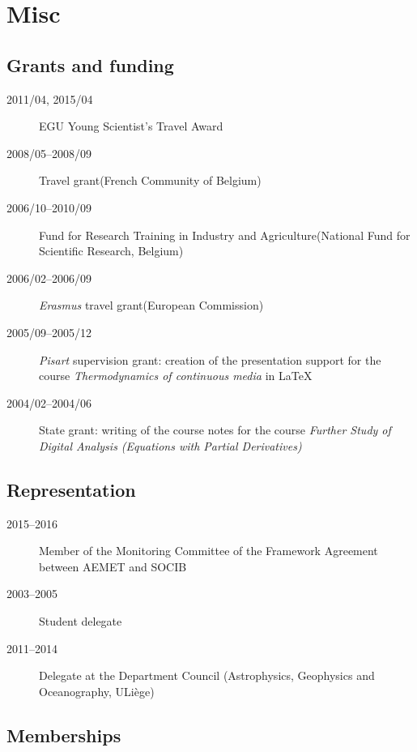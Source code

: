 \documentclass[11pt,a4paper,svgnames]{article}
\begin{document}
\vfill

\section{Misc}

\subsection{Grants and funding}

\begin{description}
\item[2011/04, 2015/04] EGU Young Scientist's Travel Award
\item[2008/05--2008/09] Travel grant\newline (French Community of Belgium)
\item[2006/10--2010/09] Fund for Research Training in Industry and Agriculture\newline (National Fund for Scientific Research, Belgium)
\item[2006/02--2006/09] \textit{Erasmus} travel grant\newline (European Commission)
\item[2005/09--2005/12] \textit{Pisart} supervision grant: creation of the presentation support for the course \textit{Thermodynamics of continuous media} in LaTeX%
\item[2004/02--2004/06] State grant: writing of the course notes for the course \textit{Further Study of Digital Analysis (Equations with Partial Derivatives)}%
\end{description}

\subsection{Representation}
\begin{description}
\item[2015--2016] Member of the Monitoring Committee of the Framework Agreement between AEMET and SOCIB
\item[2003--2005] Student delegate 
\item[2011--2014] Delegate at the Department Council (Astrophysics, Geophysics and Oceanography, ULi\`{e}ge)
\end{description}


\subsection{Memberships}
\end{document}
